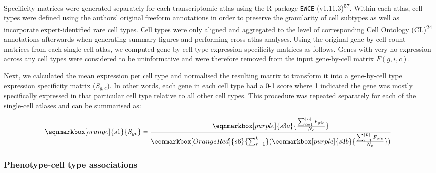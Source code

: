 \documentclass[
]{article}
\begin{document}
Specificity matrices were generated separately for each transcriptomic
atlas using the R package \texttt{EWCE} (v1.11.3)\textsuperscript{57}.
Within each atlas, cell types were defined using the authors' original
freeform annotations in order to preserve the granularity of cell
subtypes as well as incorporate expert-identified rare cell types. Cell
types were only aligned and aggregated to the level of corresponding
Cell Ontology (CL)\textsuperscript{24} annotations afterwards when
generating summary figures and performing cross-atlas analyses. Using
the original gene-by-cell count matrices from each single-cell atlas, we
computed gene-by-cell type expression specificity matrices as follows.
Genes with very no expression across any cell types were considered to
be uninformative and were therefore removed from the input gene-by-cell
matrix \(F(g,i,c)\).

Next, we calculated the mean expression per cell type and normalised the
resulting matrix to transform it into a gene-by-cell type expression
specificity matrix (\(S_{g,c}\)). In other words, each gene in each cell
type had a 0-1 score where 1 indicated the gene was mostly specifically
expressed in that particular cell type relative to all other cell types.
This procedure was repeated separately for each of the single-cell
atlases and can be summarised as:

\hfill\break

\begin{equation*}
  \eqnmarkbox[orange]{s1}{S_{gc}}
  =
  \frac{
    \eqnmarkbox[purple]{s3a}{
      \frac{
        \sum_{i=1}^{|L|} F_{gic}
      }{
        N_c  
      }
    } 
  }{
   \eqnmarkbox[OrangeRed]{s6}{\sum_{r=1}^{k}}(
     \eqnmarkbox[purple]{s3b}{
      \frac{
        \sum_{i=1}^{|L|} F_{gic}
      }{
        N_c  
      }
    } 
   ) 
  }
\end{equation*}

\hfill\break

\subsubsection{Phenotype-cell type
associations}\label{phenotype-cell-type-associations-1}
\end{document}

